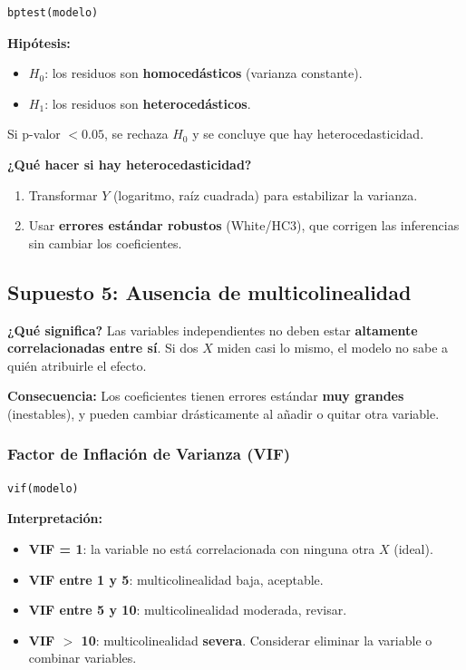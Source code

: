 \documentclass[12pt,a4paper]{article}
\begin{document}
\begin{lstlisting}
bptest(modelo)
\end{lstlisting}

\textbf{Hipótesis:}
\begin{itemize}
    \item $H_0$: los residuos son \textbf{homocedásticos} (varianza constante).
    \item $H_1$: los residuos son \textbf{heterocedásticos}.
\end{itemize}

Si p-valor $< 0.05$, se rechaza $H_0$ y se concluye que hay heterocedasticidad.

\textbf{¿Qué hacer si hay heterocedasticidad?} 
\begin{enumerate}
    \item Transformar $Y$ (logaritmo, raíz cuadrada) para estabilizar la varianza.
    \item Usar \textbf{errores estándar robustos} (White/HC3), que corrigen las inferencias sin cambiar los coeficientes.
\end{enumerate}

\subsection{Supuesto 5: Ausencia de multicolinealidad}

\textbf{¿Qué significa?} Las variables independientes no deben estar \textbf{altamente correlacionadas entre sí}. Si dos $X$ miden casi lo mismo, el modelo no sabe a quién atribuirle el efecto.

\textbf{Consecuencia:} Los coeficientes tienen errores estándar \textbf{muy grandes} (inestables), y pueden cambiar drásticamente al añadir o quitar otra variable.

\subsubsection{Factor de Inflación de Varianza (VIF)}

\begin{lstlisting}
vif(modelo)
\end{lstlisting}

\textbf{Interpretación:}
\begin{itemize}
    \item \textbf{VIF = 1}: la variable no está correlacionada con ninguna otra $X$ (ideal).
    \item \textbf{VIF entre 1 y 5}: multicolinealidad baja, aceptable.
    \item \textbf{VIF entre 5 y 10}: multicolinealidad moderada, revisar.
    \item \textbf{VIF $>$ 10}: multicolinealidad \textbf{severa}. Considerar eliminar la variable o combinar variables.
\end{itemize}
\end{document}
